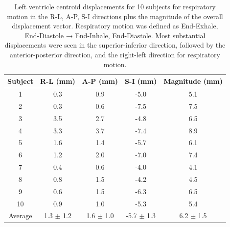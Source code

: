 \begin{table}[ht]
    \centering
    \caption[Respiratory LV motion measurements per subject.]{Left ventricle centroid displacements for 10 subjects for respiratory motion in the R-L, A-P, S-I directions plus the magnitude of the overall displacement vector.         Respiratory motion was defined as End-Exhale, End-Diastole → End-Inhale, End-Diastole. Most substantial displacements were seen in the superior-inferior direction, followed by the anterior-posterior direction, and the right-left direction for respiratory motion.}\label{tab:resp_displacement}
    \small
    \ifFinal{}
    \fi
    \vspace{0.25cm}
    \begin{tabular}{ccccc}
    \toprule
    \textbf{Subject} & \textbf{R-L (mm)} & \textbf{A-P (mm)} & \textbf{S-I (mm)} & \textbf{Magnitude (mm)} \\
    \midrule
    1  & 0.3 & 0.9 & -5.0 & 5.1 \\
    2  & 0.3 & 0.6 & -7.5 & 7.5 \\
    3  & 3.5 & 2.7 & -4.8 & 6.5 \\
    4  & 3.3 & 3.7 & -7.4 & 8.9 \\
    5  & 1.6 & 1.4 & -5.7 & 6.1 \\
    6  & 1.2 & 2.0 & -7.0 & 7.4 \\
    7  & 0.4 & 0.6 & -4.0 & 4.1 \\
    8  & 0.8 & 1.5 & -4.2 & 4.5 \\
    9  & 0.6 & 1.5 & -6.3 & 6.5 \\
    10 & 0.9 & 1.0 & -5.3 & 5.4 \\
    \midrule
    Average & 1.3 $\pm$ 1.2 & 1.6 $\pm$ 1.0 & -5.7 $\pm$ 1.3 & 6.2 $\pm$ 1.5 \\
    \bottomrule
    \end{tabular}
\end{table}

